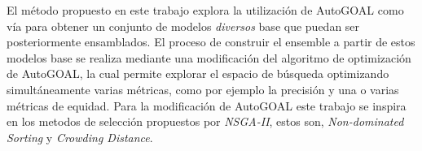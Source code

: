 El método propuesto en este trabajo explora la utilización de AutoGOAL como vía para obtener un conjunto de modelos \emph{diversos} base que puedan ser posteriormente ensamblados.
El proceso de construir el ensemble a partir de estos modelos base se realiza mediante una modificación del algoritmo de optimización de AutoGOAL, la cual permite explorar el espacio de búsqueda optimizando simultáneamente varias métricas, como por ejemplo la precisión y una o varias métricas de equidad.
Para la modificación de AutoGOAL este trabajo se inspira en los metodos de selección propuestos por \emph{NSGA-II}, estos son, \emph{Non-dominated Sorting} y \emph{Crowding Distance}.
